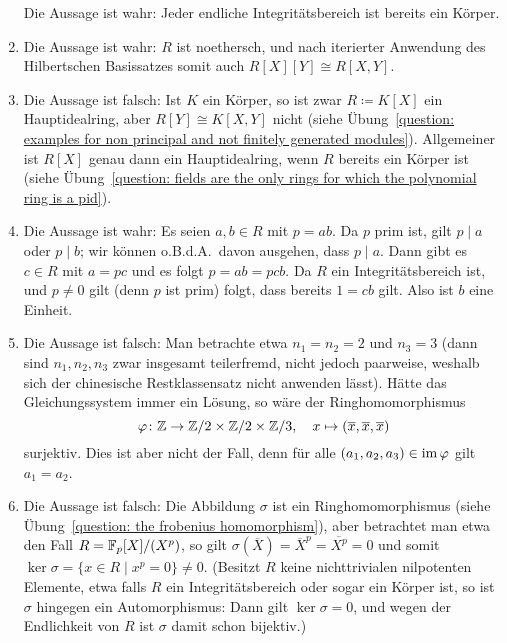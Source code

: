 \begin{solution}
\begin{enumerate}
      Die Aussage ist wahr:
      Jeder endliche Integritätsbereich ist bereits ein Körper.
    \item
      Die Aussage ist wahr:
      $R$ ist noethersch, und nach iterierter Anwendung des Hilbertschen Basissatzes somit auch $R[X][Y] \cong R[X,Y]$.
    \item
      Die Aussage ist falsch:
      Ist $K$ ein Körper, so ist zwar $R \coloneqq K[X]$ ein Hauptidealring, aber $R[Y] \cong K[X,Y]$ nicht (siehe Übung~\ref{question: examples for non principal and not finitely generated modules}).
      Allgemeiner ist $R[X]$ genau dann ein Hauptidealring, wenn $R$ bereits ein Körper ist (siehe Übung~\ref{question: fields are the only rings for which the polynomial ring is a pid}).
    \item
      Die Aussage ist wahr:
      Es seien $a, b \in R$ mit $p = ab$.
      Da $p$ prim ist, gilt $p \mid a$ oder $p \mid b$;
      wir können o.B.d.A.\ davon ausgehen, dass $p \mid a$.
      Dann gibt es $c \in R$ mit $a = pc$ und es folgt $p = ab = pcb$.
      Da $R$ ein Integritätsbereich ist, und $p \neq 0$ gilt (denn $p$ ist prim) folgt, dass bereits $1 = cb$ gilt.
      Also ist $b$ eine Einheit.
    \item
      Die Aussage ist falsch:
      Man betrachte etwa $n_1 = n_2 = 2$ und $n_3 = 3$ (dann sind $n_1, n_2, n_3$ zwar insgesamt teilerfremd, nicht jedoch paarweise, weshalb sich der chinesische Restklassensatz nicht anwenden lässt).
      Hätte das Gleichungssystem immer ein Lösung, so wäre der Ringhomomorphismus
      \[
                \varphi
        \colon  \mathbb{Z} \to \mathbb{Z}/2 \times \mathbb{Z}/2 \times \mathbb{Z}/3,
        \quad   x
        \mapsto (\overline{x}, \overline{x}, \overline{x})
      \]
      surjektiv.
      Dies ist aber nicht der Fall, denn für alle $(a_1, a_2, a_3) \in \operatorname{im} \varphi$ gilt $a_1 = a_2$.
    \item
      Die Aussage ist falsch:
      Die Abbildung $\sigma$ ist ein Ringhomomorphismus (siehe Übung~\ref{question: the frobenius homomorphism}), aber betrachtet man etwa den Fall $R = \mathbb{F}_p[X]/(X^p)$, so gilt $\sigma(\overline{X}) = \overline{X}^p = \overline{X^p} = 0$ und somit $\ker \sigma = \{x \in R \mid x^p = 0\} \neq 0$.
      (Besitzt $R$ keine nichttrivialen nilpotenten Elemente, etwa falls $R$ ein Integritätsbereich oder sogar ein Körper ist, so ist $\sigma$ hingegen ein Automorphismus:
      Dann gilt $\ker \sigma = 0$, und wegen der Endlichkeit von $R$ ist $\sigma$ damit schon bijektiv.)
  \end{enumerate}
\end{solution}


